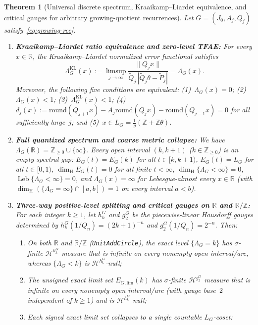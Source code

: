 \documentclass[11pt]{article}
\newtheorem{theorem}{Theorem}
\theoremstyle{definition}
\theoremstyle{remark}
\newcommand{\R}{\mathbb{R}}
\newcommand{\Z}{\mathbb{Z}}
\newcommand{\dimH}{\dim_{\mathrm{H}}}
\newcommand{\Lam}{\Lambda}
\begin{document}
\begin{theorem}[Universal discrete spectrum, Kraaikamp--Liardet equivalence, and critical gauges for arbitrary growing-quotient recurrences]\label{thm:growing-rec-spectrum}
Let $G=(J_0,A_j,Q_j)$ satisfy~\eqref{eq:growing-rec}.
\begin{enumerate}[label=(\roman*),leftmargin=2.2em]
\item \textbf{Kraaikamp--Liardet ratio equivalence and zero-level TFAE:}
For every $x\in\R$, the Kraaikamp--Liardet normalized error functional satisfies
\[
\Lam_G^{\mathrm{KL}}(x)
:=\limsup_{j\to\infty}\frac{\|Q_j x\|}{\widetilde Q_j\,|\widetilde Q_j\theta-\widetilde P_j|}
=\Lam_G(x).
\]
Moreover, the following five conditions are equivalent:
\textup{(1)}~$\Lam_G(x)=0$; \textup{(2)}~$\Lam_G(x)<1$;
\textup{(3)}~$\Lam_G^{\mathrm{KL}}(x)<1$;
\textup{(4)}~$d_j(x):=\mathrm{round}(Q_{j+1}x)-A_j\mathrm{round}(Q_j x)-\mathrm{round}(Q_{j-1}x)=0$ for all sufficiently large~$j$; and
\textup{(5)}~$x\in L_G=\frac{1}{g}(\Z+\Z\theta)$.
\item \textbf{Full quantized spectrum and coarse metric collapse:}
We have $\Lam_G(\R)=\Z_{\ge0}\cup\{\infty\}$. Every open interval $(k,k+1)$
($k\in\Z_{\ge0}$) is an empty spectral gap: $E_G(t)=E_G(k)$ for all $t\in[k,k+1)$,
$E_G(t)=L_G$ for all $t\in[0,1)$, $\dimH E_G(t)=0$ for all finite $t<\infty$,
$\dimH\{\Lam_G<\infty\}=0$, $\operatorname{Leb}\{\Lam_G<\infty\}=0$, and
$\Lam_G(x)=\infty$ for Lebesgue-almost every $x\in\R$ (with
$\dimH(\{\Lam_G=\infty\}\cap[a,b])=1$ on every interval $a<b$).
\item \textbf{Three-way positive-level splitting and critical gauges on $\R$ and $\R/\Z$:}
For each integer $k\ge1$, let $h_k^G$ and $g_2^G$ be the piecewise-linear Hausdorff
gauges determined by $h_k^G(1/Q_n)=(2k+1)^{-n}$ and $g_2^G(1/Q_n)=2^{-n}$. Then:
\begin{enumerate}[label=(\alph*),leftmargin=1.6em]
\item On both $\R$ and $\R/\Z$ (\texttt{UnitAddCircle}), the exact level
$\{\Lam_G=k\}$ has $\sigma$-finite $\mathcal H^{h_k^G}$ measure that is infinite
on every nonempty open interval/arc, whereas $\{\Lam_G<k\}$ is
$\mathcal H^{h_k^G}$-null;
\item The unsigned exact limit set $E_{G,\mathrm{lim}}(k)$ has $\sigma$-finite
$\mathcal H^{g_2^G}$ measure that is infinite on every nonempty open interval/arc
(with gauge base~$2$ independent of $k\ge1$) and is $\mathcal H^{h_k^G}$-null;
\item Each signed exact limit set collapses to a single countable $L_G$-coset:

\end{enumerate}
\end{enumerate}
\end{theorem}
\end{document}
